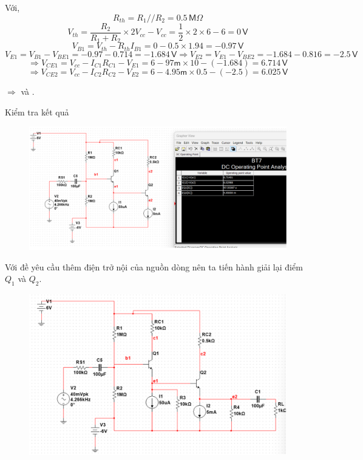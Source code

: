 Với, 
\[ R_{th} = R_{1} // R_{2} = 0.5\,\textsf{M}\Omega \]
\[ V_{th} = \dfrac{R_{2}}{R_{1} + R_{2}}\times 2V_{cc} - V_{cc} = \dfrac{1}{2}\times 2 \times 6 - 6 = 0\,\textsf{V} \]
\[ V_{B1} = V_{th} - R_{th}I_{B1} = 0 - 0.5\times 1.94 = -0.97\,\textsf{V}\]
\[ V_{E1} = V_{B1} - V_{BE1} = -0.97 - 0.714 = -1.684\,\textsf{V} \Rightarrow V_{E2} = V_{E1} - V_{BE2} = -1.684-0.816 = -2.5\,\textsf{V} \]
\[ \Rightarrow V_{CE1} = V_{cc} - I_{C1}R_{C1} - V_{E1} = 6 - 97\textsf{m}\times 10 - (- 1.684) = 6.714\,\textsf{V}\]
\[ \Rightarrow V_{CE2} = V_{cc} - I_{C2}R_{C2} - V_{E2} = 6-4.95\textsf{m}\times 0.5 - (- 2.5) = 6.025\,\textsf{V}\]

$\Rightarrow$  và .

Kiểm tra kết quả

\begin{figure}[H]
	\centering
	\includegraphics[width=.8\linewidth]{./my-chapters/my-images/Question7/a_ketqua_hinh.png}
\end{figure}


Với đề yêu cầu thêm điện trở nội của nguồn dòng nên ta tiến hành giải lại điểm $Q_{1}$ và $Q_{2}$.

\begin{figure}[H]
	\centering
	\includegraphics[width=.8\linewidth]{./my-chapters/my-images/Question7/b_giaiQ.png}
\end{figure}

